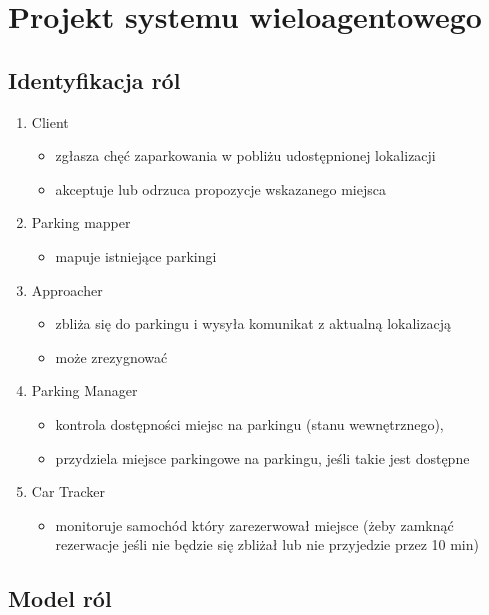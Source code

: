 \newpage
\section{Projekt systemu wieloagentowego}

\subsection{Identyfikacja ról}

\begin{enumerate}

\item Client 
\begin{itemize}
    \item zgłasza chęć zaparkowania w pobliżu udostępnionej lokalizacji
    \item akceptuje lub odrzuca propozycje wskazanego miejsca 
\end{itemize}
 
\item Parking mapper
\begin{itemize}
    \item mapuje istniejące parkingi
\end{itemize}
\item Approacher
\begin{itemize}
    \item zbliża się do parkingu i wysyła komunikat z aktualną lokalizacją
\item może zrezygnować
\end{itemize}
\item Parking Manager
\begin{itemize}
    \item kontrola dostępności miejsc na parkingu (stanu wewnętrznego),
\item przydziela miejsce parkingowe na parkingu, jeśli takie jest dostępne
\end{itemize}
\item Car Tracker 
\begin{itemize}
    \item monitoruje samochód który zarezerwował miejsce (żeby zamknąć rezerwacje jeśli
 nie będzie się zbliżał lub nie przyjedzie przez 10 min)
\end{itemize}
\end{enumerate}




\newpage
\subsection{Model ról}

